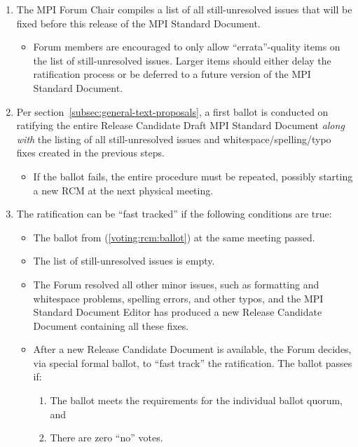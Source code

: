 \begin{enumerate}
\begin{enumerate}
  \item The MPI Forum Chair compiles a list of all still-unresolved
    issues that will be fixed before this release of the MPI Standard
    Document.
    \begin{itemize}
    \item Forum members are encouraged to only allow
      ``errata''-quality items on the list of still-unresolved
      issues.  Larger items should either delay the ratification
      process or be deferred to a future version of the MPI Standard
      Document.
    \end{itemize}

  \item\label{voting:rcm:ballot} Per section~\ref{subsec:general-text-proposals}, a first
    ballot is conducted on ratifying the entire Release Candidate
    Draft MPI Standard Document {\em along with} the listing of all
    still-unresolved issues and whitespace/spelling/typo fixes created
    in the previous steps.
    \begin{itemize}
    \item If the ballot fails, the entire procedure must be repeated,
      possibly starting a new RCM at the next physical meeting.
    \end{itemize}

  \item The ratification can be ``fast tracked'' if the following
    conditions are true:

    \begin{itemize}
    \item The ballot from (\ref{voting:rcm:ballot}) at the
      same meeting passed.
    \item  The list of still-unresolved issues is empty.
    \item The Forum resolved all other minor issues, such as
      formatting and whitespace problems, spelling errors, and other
      typos, and the MPI Standard Document Editor has produced a new
      Release Candidate Document containing all these fixes.
    \item After a new Release Candidate Document is available, the
      Forum decides, via special formal ballot, to ``fast track'' the
      ratification.  The ballot passes if:
      \begin{enumerate}
      \item The ballot meets the requirements for the individual
        ballot quorum, and
      \item There are zero ``no'' votes.
      \end{enumerate}
    \end{itemize}


\end{enumerate}
\end{enumerate}
